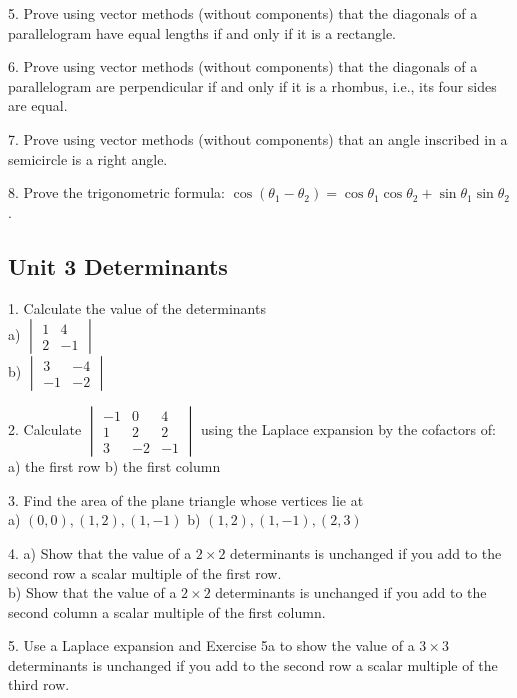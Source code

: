 \documentclass{article}
\begin{document}
5. Prove using vector methods (without components) that the diagonals of a
parallelogram have equal lengths if and only if it is a rectangle.

6. Prove using vector methods (without components) that the diagonals of a
parallelogram are perpendicular if and only if it is a rhombus, i.e., its four
sides are equal.

7. Prove using vector methods (without components) that an angle inscribed in
a semicircle is a right angle.

8. Prove the trigonometric formula: $\cos(\theta_{1} - \theta_{2}) =
\cos\theta_{1}\cos\theta_{2} + \sin\theta_{1}\sin\theta_{2}$.

\subsection*{Unit 3 Determinants}

1. Calculate the value of the determinants\\
a) $\begin{vmatrix}
    1 & 4 \\
    2 & -1
\end{vmatrix}$\\
b) $\begin{vmatrix}
    3 & -4 \\
    -1 & -2
\end{vmatrix}$

2. Calculate $\begin{vmatrix}
    -1 & 0 & 4 \\
    1 & 2 & 2 \\
    3 & -2 & -1
\end{vmatrix}$ using the Laplace expansion by the cofactors of:\\
a) the first row \hspace{10px} b) the first column

3. Find the area of the plane triangle whose vertices lie at\\
a) $(0, 0), (1, 2), (1, -1)$ \hspace{10px} b) $(1, 2), (1, -1), (2, 3)$

4. a) Show that the value of a $2 \times 2$ determinants is unchanged if you add
to the second row a scalar multiple of the first row.\\
   b) Show that the value of a $2 \times 2$ determinants is unchanged if you add
to the second column a scalar multiple of the first column.

5. Use a Laplace expansion and Exercise 5a to show the value of a $3 \times 3$
determinants is unchanged if you add to the second row a scalar multiple of the
third row.
\end{document}

